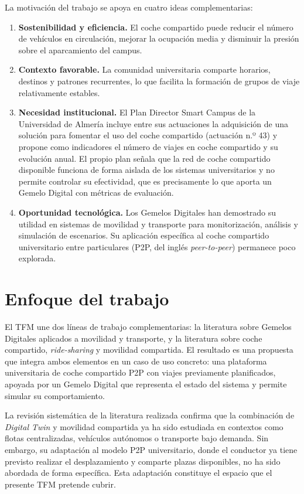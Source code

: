 La motivación del trabajo se apoya en cuatro ideas complementarias:
\begin{enumerate}
    \item \textbf{Sostenibilidad y eficiencia.} El coche compartido puede reducir el número de vehículos en circulación, mejorar la ocupación media y disminuir la presión sobre el aparcamiento del campus.
    \item \textbf{Contexto favorable.} La comunidad universitaria comparte horarios, destinos y patrones recurrentes, lo que facilita la formación de grupos de viaje relativamente estables.
    \item \textbf{Necesidad institucional.} El Plan Director Smart Campus de la Universidad de Almería \cite{UALSmartCampus2019} incluye entre sus actuaciones la adquisición de una solución para fomentar el uso del coche compartido (actuación n.º 43) y propone como indicadores el número de viajes en coche compartido y su evolución anual. El propio plan señala que la red de coche compartido disponible funciona de forma aislada de los sistemas universitarios y no permite controlar su efectividad, que es precisamente lo que aporta un Gemelo Digital con métricas de evaluación.
    \item \textbf{Oportunidad tecnológica.} Los Gemelos Digitales han demostrado su utilidad en sistemas de movilidad y transporte para monitorización, análisis y simulación de escenarios. Su aplicación específica al coche compartido universitario entre particulares (P2P, del inglés \textit{peer-to-peer}) permanece poco explorada.
\end{enumerate}

\section{Enfoque del trabajo}

El TFM une dos líneas de trabajo complementarias: la literatura sobre Gemelos Digitales aplicados a movilidad y transporte, y la literatura sobre coche compartido, \textit{ride-sharing} y movilidad compartida. El resultado es una propuesta que integra ambos elementos en un caso de uso concreto: una plataforma universitaria de coche compartido P2P con viajes previamente planificados, apoyada por un Gemelo Digital que representa el estado del sistema y permite simular su comportamiento.

La revisión sistemática de la literatura realizada confirma que la combinación de \textit{Digital Twin} y movilidad compartida ya ha sido estudiada en contextos como flotas centralizadas, vehículos autónomos o transporte bajo demanda. Sin embargo, su adaptación al modelo P2P universitario, donde el conductor ya tiene previsto realizar el desplazamiento y comparte plazas disponibles, no ha sido abordada de forma específica. Esta adaptación constituye el espacio que el presente TFM pretende cubrir.
